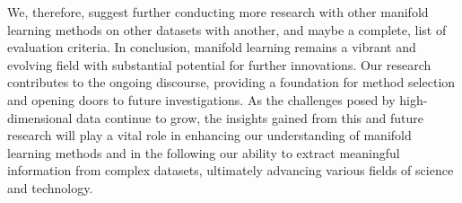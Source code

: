 We, therefore, suggest further conducting more research with other manifold learning methods on other datasets with another, and maybe a complete, list of evaluation criteria. In conclusion, manifold learning remains a vibrant and evolving field with substantial potential for further innovations. Our research contributes to the ongoing discourse, providing a foundation for method selection and opening doors to future investigations. As the challenges posed by high-dimensional data continue to grow, the insights gained from this and future research will play a vital role in enhancing our understanding of manifold learning methods and in the following our ability to extract meaningful information from complex datasets, ultimately advancing various fields of science and technology.